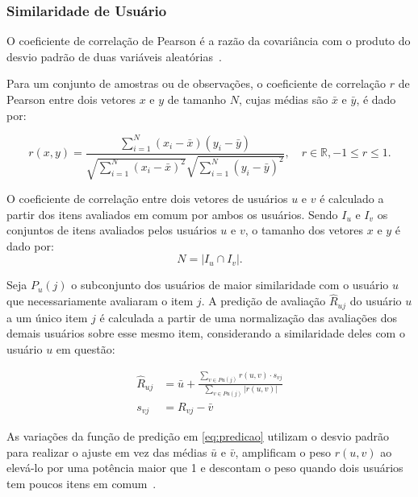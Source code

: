 \subsubsection{Similaridade de Usuário}
O coeficiente de correlação de Pearson é a razão da covariância com o produto
do desvio padrão de duas variáveis aleatórias~\cite{aggarwal2016recommender}.

Para um conjunto de amostras ou de observações, o coeficiente de
correlação $r$ de Pearson entre dois vetores $x$ e $y$ de tamanho $N$, cujas
médias são $\bar{x}$ e $\bar{y}$, é dado por:

\begin{equation}    
    r(x,y) = \frac{\sum_{i=1}^{N}(x_i - \bar{x})(y_i - \bar{y})}{\sqrt{\sum_{i=1}^{N}(x_i - \bar{x})^2} \sqrt{\sum_{i=1}^{N}(y_i - \bar{y})^2}}, \quad r \in \mathbb{R}, -1 \leq r \leq 1.
\end{equation}

O coeficiente de correlação entre dois vetores de usuários $u$ e $v$ é calculado
a partir dos itens avaliados em comum por ambos os usuários. Sendo $I_u$ e $I_v$
os conjuntos de itens avaliados pelos usuários $u$ e $v$,
o tamanho dos vetores $x$ e $y$ é dado por:
\begin{equation}
    N = |I_u \cap I_v|.
\end{equation}

Seja $P_u (j)$ o subconjunto dos usuários de maior similaridade com o usuário
$u$ que necessariamente avaliaram o item $j$. 
A predição de avaliação
$\hat{R}_{uj}$ do usuário $u$ a um único item $j$ é calculada a partir de uma
normalização das avaliações dos demais usuários sobre esse mesmo item,
considerando a similaridade deles com o usuário $u$ em questão:

\begin{align}
    \label{eq:predicao}
\hat{R}_{uj} &= \bar{u} + \frac{\sum_{v \in Pu(j)} r(u,v) \cdot s_{vj}}{\sum_{v \in Pu(j)} |r(u,v)|} \\
s_{vj} &= R_{vj} - \bar{v} \label{eq:centered_mean}
\end{align}

As variações da função de predição em \ref{eq:predicao} utilizam o desvio padrão
para realizar o ajuste em vez das médias $\bar{u}$ e $\bar{v}$, amplificam o
peso $r(u,v)$ ao elevá-lo por uma potência maior que 1 e descontam o peso quando
dois usuários tem poucos itens em comum~\cite{aggarwal2016recommender}.


